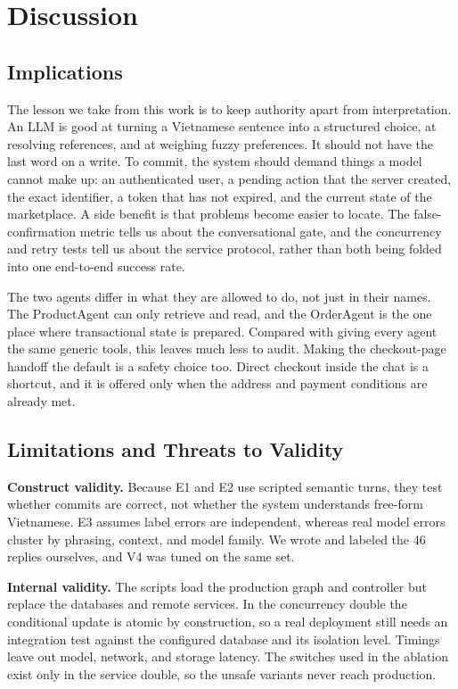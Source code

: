 \documentclass{IEEEtran}
\begin{document}
\section{Discussion}

\subsection{Implications}

The lesson we take from this work is to keep authority apart from interpretation. An LLM is good at turning a Vietnamese sentence into a structured choice, at resolving references, and at weighing fuzzy preferences. It should not have the last word on a write. To commit, the system should demand things a model cannot make up: an authenticated user, a pending action that the server created, the exact identifier, a token that has not expired, and the current state of the marketplace. A side benefit is that problems become easier to locate. The false-confirmation metric tells us about the conversational gate, and the concurrency and retry tests tell us about the service protocol, rather than both being folded into one end-to-end success rate.

The two agents differ in what they are allowed to do, not just in their names. The ProductAgent can only retrieve and read, and the OrderAgent is the one place where transactional state is prepared. Compared with giving every agent the same generic tools, this leaves much less to audit. Making the checkout-page handoff the default is a safety choice too. Direct checkout inside the chat is a shortcut, and it is offered only when the address and payment conditions are already met.

\subsection{Limitations and Threats to Validity}

\textbf{Construct validity.} Because E1 and E2 use scripted semantic turns, they test whether commits are correct, not whether the system understands free-form Vietnamese. E3 assumes label errors are independent, whereas real model errors cluster by phrasing, context, and model family. We wrote and labeled the 46 replies ourselves, and V4 was tuned on the same set.

\textbf{Internal validity.} The scripts load the production graph and controller but replace the databases and remote services. In the concurrency double the conditional update is atomic by construction, so a real deployment still needs an integration test against the configured database and its isolation level. Timings leave out model, network, and storage latency. The switches used in the ablation exist only in the service double, so the unsafe variants never reach production.
\end{document}
